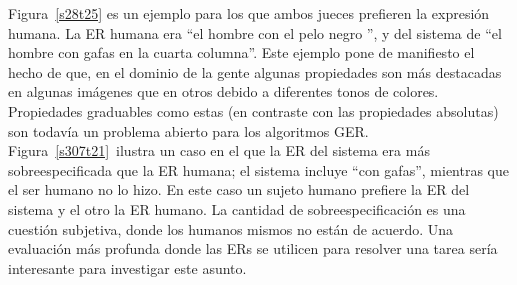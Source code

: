 


Figura~\ref{s28t25} es un ejemplo para los que ambos jueces prefieren la expresi\'on humana. La ER humana era ``el hombre con el pelo negro '', y del sistema de ``el hombre con gafas en la cuarta columna''. Este ejemplo pone de manifiesto el hecho de que, en el dominio de la gente algunas propiedades son m\'as destacadas en algunas im\'agenes que en otros debido a diferentes tonos de colores. Propiedades graduables como estas (en contraste con las propiedades absolutas) son todav\'{i}a un problema abierto para los algoritmos GER.\\

Figura~\ref{s307t21}~ilustra un caso en el que la ER del sistema era m\'as sobreespecificada que la ER humana; el sistema incluye ``con gafas'', mientras que el ser humano no lo hizo. En este caso un sujeto humano prefiere la ER del sistema y el otro la ER humano. La cantidad de sobreespecificaci\'on es una cuesti\'on subjetiva, donde los humanos mismos no est\'an de acuerdo. Una evaluaci\'on m\'as profunda donde las ERs se utilicen para resolver una tarea ser\'{i}a interesante para investigar este asunto.



